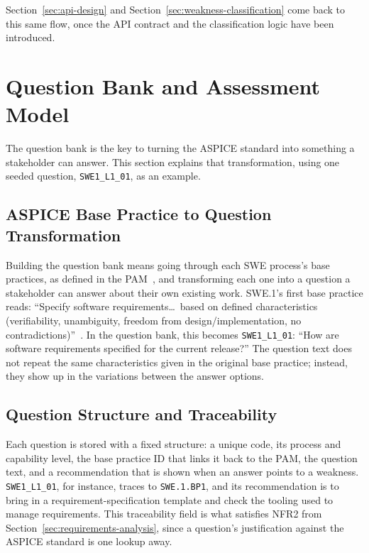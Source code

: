 \documentclass[a4paper, 12pt, oneside, openany, BCOR1cm,toc=chapterentrywithdots]{scrbook}
\begin{document}
Section~\ref{sec:api-design} and Section~\ref{sec:weakness-classification} come back to this
same flow, once the API contract and the classification logic have been introduced.

\section{Question Bank and Assessment Model}

The question bank is the key to turning the ASPICE standard into something a stakeholder can
answer. This section explains that transformation, using one seeded question,
\texttt{SWE1\_L1\_01}, as an example.

\subsection{ASPICE Base Practice to Question Transformation}

Building the question bank means going through each SWE process's base practices, as defined in
the PAM~\cite{vdaqmc2023pam}, and transforming each one into a question a stakeholder can answer
about their own existing work. SWE.1's first base practice reads: ``Specify software
requirements\ldots\ based on defined characteristics (verifiability, unambiguity, freedom from
design/implementation, no contradictions)''~\cite{vdaqmc2023pam}. In the question bank, this
becomes \texttt{SWE1\_L1\_01}: ``How are software requirements specified for the current
release?'' The question text does not repeat the same characteristics given in the original base
practice; instead, they show up in the variations between the answer options.

\subsection{Question Structure and Traceability}

Each question is stored with a fixed structure: a unique code, its process and capability
level, the base practice ID that links it back to the PAM, the question text, and a
recommendation that is shown when an answer points to a weakness. \texttt{SWE1\_L1\_01}, for
instance, traces to \texttt{SWE.1.BP1}, and its recommendation is to bring in a
requirement-specification template and check the tooling used to manage requirements. This
traceability field is what satisfies NFR2 from Section~\ref{sec:requirements-analysis}, since a
question's justification against the ASPICE standard is one lookup away.
\end{document}
